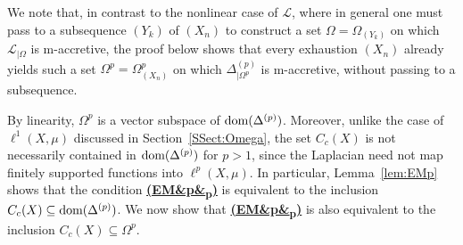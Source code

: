 \documentclass[letterpaper]{article}
\theoremstyle{definition}
\theoremstyle{named}
\numberwithin{equation}{section}
\newcommand{\EM}[1][]{\hyperlink{ass:EM}{\textup{\textbf{(EM\ifx&#1&\else\textsubscript{#1}\fi)}}}}
\newcommand{\dom}{\textnormal{dom}} %
\newcommand{\Deltaphi}{\mathcal{L}}
\begin{document}
We note that, in contrast to the nonlinear case of $\Deltaphi$, where in general one
must pass to a subsequence $(Y_k)$ of $(X_n)$ to construct a set
$\Omega=\Omega_{(Y_k)}$ on which $\Deltaphi_{|\Omega}$ is m-accretive, the proof below
shows that every exhaustion $(X_n)$ already yields such a set
$\Omega^p = \Omega^p_{(X_n)}$ on which $\Delta^{(p)}_{|\Omega^p}$ is m-accretive,
without passing to a subsequence. 


By linearity, $\Omega^p$ is a vector subspace of $\dom(\Delta^{(p)})$. Moreover, unlike
the case of $\ell^1(X,\mu)$ discussed in Section~\ref{SSect:Omega}, the set $C_c(X)$ is
not necessarily contained in $\dom(\Delta^{(p)})$ for $p>1$, since the Laplacian need not
map finitely supported functions into $\ell^p(X,\mu)$. In particular,
Lemma~\ref{lem:EMp} shows that the condition \EM[p] is equivalent to the inclusion
$C_c(X) \subseteq \dom(\Delta^{(p)})$. We now show that \EM[p] is also equivalent to the inclusion
$C_c(X) \subseteq \Omega^p$.
\end{document}
